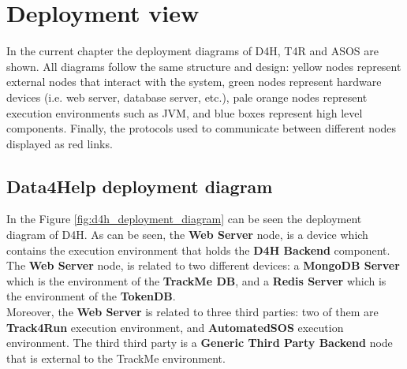 \documentclass[a4paper, hidelinks, 12pt]{report}
\begin{document}
	\section{Deployment view}
	In the current chapter the deployment diagrams of D4H, T4R and ASOS are shown. All diagrams follow the same structure and design: yellow nodes represent external nodes that interact with the system, green nodes represent hardware devices (i.e. web server, database server, etc.), pale orange nodes represent execution environments such as JVM, and blue boxes represent high level components. Finally, the protocols used to communicate between different nodes displayed as red links.
	
	\subsection{Data4Help deployment diagram}
	In the Figure \ref{fig:d4h_deployment_diagram} can be seen the deployment diagram of D4H. As can be seen, the \textbf{Web Server} node, is a device which contains the execution environment that holds the \textbf{D4H Backend} component. The \textbf{Web Server} node, is related to two different devices: a \textbf{MongoDB Server} which is the environment of the \textbf{TrackMe DB}, and a \textbf{Redis Server} which is the environment of the \textbf{TokenDB}.\\
	
	Moreover, the \textbf{Web Server} is related to three third parties: two of them are \textbf{Track4Run} execution environment, and \textbf{AutomatedSOS} execution environment. The third third party is a \textbf{Generic Third Party Backend} node that is external to the TrackMe environment.\\
	
\end{document}
